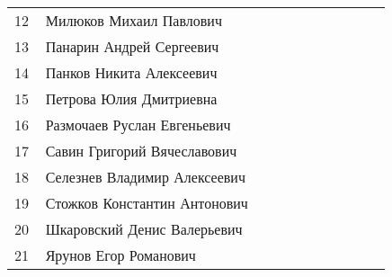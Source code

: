 \documentclass[a4paper,landscape,11pt]{article}
\newcommand*\ok{&{\small \ding{51}}} %
\newcommand*\no{&{\small }} %
\begin{document}
\begin{tabular}{p{7pt}|l|p{\CS}|p{\CS}|p{\CS}|p{\CS}|p{\CS}|p{\CS}|p{\CS}|p{\CS}|p{\CS}}
12\,& Милюков Михаил Павлович         \ok\ok&&&&&&\\
13\,& Панарин Андрей Сергеевич        \ok\ok&&&&&&\\
14\,& Панков Никита Алексеевич        \no\no&&&&&&\\
15\,& Петрова Юлия Дмитриевна         \ok\ok&&&&&&\\
\midrule
16\,& Размочаев Руслан Евгеньевич     \ok\ok&&&&&&\\
17\,& Савин Григорий Вячеславович     \ok\ok&&&&&&\\
18\,& Селезнев Владимир Алексеевич    \ok\no&&&&&&\\ 
19\,& Стожков Константин Антонович    \no\no&&&&&&\\
20\,& Шкаровский Денис Валерьевич     \no\ok&&&&&&\\
\midrule
21\,& Ярунов Егор Романович           \ok\ok&&&&&&\\
\bottomrule
\end{tabular} 
\end{document}
